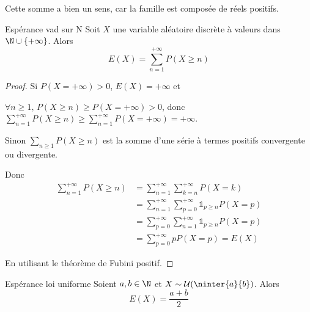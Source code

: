 \begin{remarque}
    Cette somme a bien un sens, car la famille est composée de réels positifs.
\end{remarque}

\begin{proposition}{Espérance vad sur N }{}
    Soit $X$ une variable aléatoire discrète à valeurs dans $\N \cup \{+\infty\}$. Alors
    $$ E(X) = \sum_{n = 1}^{+ \infty} P(X \geqslant n) $$
\end{proposition}

\begin{proof}
    Si $P(X = + \infty) >0$, $E(X) = + \infty$ et

    $\forall n \geqslant 1, \, P(X \geqslant n) \geqslant P(X = + \infty) > 0$, donc
    $\displaystyle \sum_{n = 1}^{+ \infty} P(X \geqslant n) \geqslant \sum_{n = 1}^{+ \infty} P(X = + \infty) = + \infty$.

    \avspace Sinon $\sum_{n \geqslant 1} P(X \geqslant n)$ est la somme d'une série à termes positifs
    convergente ou divergente.

    Donc 
    \begin{align}
        \sum_{n = 1}^{+ \infty} P(X \geqslant n) & = \sum_{n = 1}^{+ \infty} \sum_{k = n}^{+ \infty} P(X = k) \\
        & = \sum_{n = 1}^{+ \infty} \sum_{p = 0}^{+ \infty} \mathbb 1_{p \geqslant n} P(X = p) \\
        & = \sum_{p = 0}^{+ \infty} \sum_{n = 1}^{+ \infty} \mathbb 1_{p \geqslant n} P(X = p) \\
        & = \sum_{p = 0}^{+ \infty} p P(X = p) = E(X)
    \end{align}

    En utilisant le théorème de Fubini positif. 

\end{proof}

\begin{proposition}{Espérance loi uniforme}{}
    Soient $a, b \in \N$ et $X \sim \mathcal U(\ninter{a}{b})$. Alors
    $$ E(X) = \frac{a + b}{2} $$
\end{proposition}

